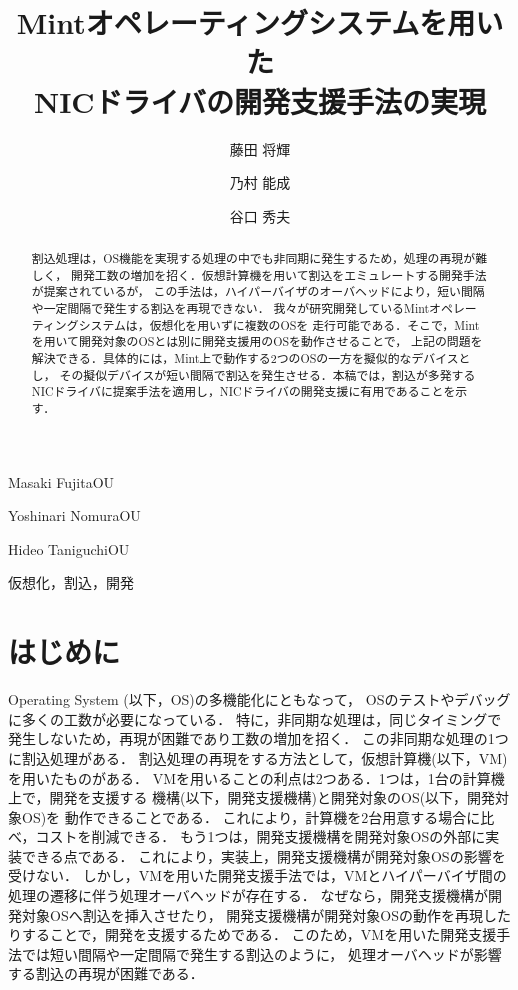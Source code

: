 \documentclass[submit,techreq,noauthor,dvipdfmx]{ipsj}
\begin{document}
\title{Mintオペレーティングシステムを用いた\\NICドライバの開発支援手法の実現}


\author{藤田 将輝}{Masaki Fujita}{OU}
\author{乃村 能成}{Yoshinari Nomura}{OU}
\author{谷口 秀夫}{Hideo Taniguchi}{OU}

\begin{abstract}
    割込処理は，OS機能を実現する処理の中でも非同期に発生するため，処理の再現が難しく，
    開発工数の増加を招く．仮想計算機を用いて割込をエミュレートする開発手法が提案されているが，
    この手法は，ハイパーバイザのオーバヘッドにより，短い間隔や一定間隔で発生する割込を再現できない．
    我々が研究開発しているMintオペレーティングシステムは，仮想化を用いずに複数のOSを
    走行可能である．そこで，Mintを用いて開発対象のOSとは別に開発支援用のOSを動作させることで，
    上記の問題を解決できる．具体的には，Mint上で動作する2つのOSの一方を擬似的なデバイスとし，
    その擬似デバイスが短い間隔で割込を発生させる．本稿では，割込が多発する
    NICドライバに提案手法を適用し，NICドライバの開発支援に有用であることを示す． 
\end{abstract}

\begin{jkeyword}
    仮想化，割込，開発
\end{jkeyword}
\maketitle

\section{はじめに}

Operating System (以下，OS)の多機能化にともなって，
OSのテストやデバッグに多くの工数が必要になっている\cite{chou2001empirical}．
特に，非同期な処理は，同じタイミングで発生しないため，再現が困難であり工数の増加を招く．
この非同期な処理の1つに割込処理がある．
割込処理の再現をする方法として，仮想計算機(以下，VM)を用いたものがある．
VMを用いることの利点は2つある．1つは，1台の計算機上で，開発を支援する
機構(以下，開発支援機構)と開発対象のOS(以下，開発対象OS)を
動作できることである．
これにより，計算機を2台用意する場合に比べ，コストを削減できる．
もう1つは，開発支援機構を開発対象OSの外部に実装できる点である．
これにより，実装上，開発支援機構が開発対象OSの影響を受けない．
しかし，VMを用いた開発支援手法では，VMとハイパーバイザ間の処理の遷移に伴う処理オーバヘッドが存在する．
なぜなら，開発支援機構が開発対象OSへ割込を挿入させたり，
開発支援機構が開発対象OSの動作を再現したりすることで，開発を支援するためである．
このため，VMを用いた開発支援手法では短い間隔や一定間隔で発生する割込のように，
処理オーバヘッドが影響する割込の再現が困難である．
\end{document}
